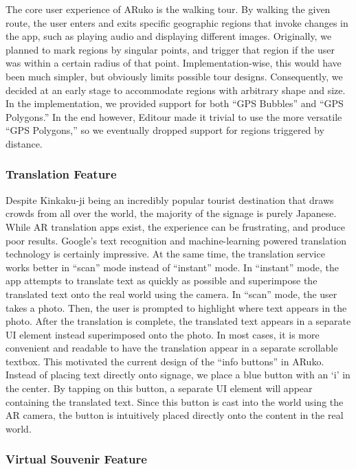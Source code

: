 \documentclass[a4paper, 10pt, american, titlepage]{article}
\begin{document}
The core user experience of ARuko is the walking tour. By walking the given
route, the user enters and exits specific geographic regions that invoke
changes in the app, such as playing audio and displaying different images.
Originally, we planned to mark regions by singular points, and trigger that
region if the user was within a certain radius of that point.
Implementation-wise, this would have been much simpler, but obviously limits
possible tour designs. Consequently, we decided at an early stage to
accommodate regions with arbitrary shape and size.  In the implementation, we
provided support for both ``GPS Bubbles'' and ``GPS Polygons.'' In the end
however, Editour made it trivial to use the more versatile ``GPS Polygons,'' so
we eventually dropped support for regions triggered by distance.

\subsubsection{Translation Feature}
\label{sec:translationFeature}

Despite Kinkaku-ji being an incredibly popular tourist destination that draws
crowds from all over the world, the majority of the signage is purely
Japanese. While AR translation apps exist, the experience can be frustrating,
and produce poor results. Google's text recognition and machine-learning
powered translation technology is certainly impressive. At the same time, the
translation service works better in ``scan'' mode instead of ``instant''
mode. In ``instant'' mode, the app attempts to translate text as quickly as
possible and superimpose the translated text onto the real world using the
camera. In ``scan'' mode, the user takes a photo. Then, the user is prompted
to highlight where text appears in the photo. After the translation is
complete, the translated text appears in a separate UI element instead
superimposed onto the photo. In most cases, it is more convenient and
readable to have the translation appear in a separate scrollable textbox.
This motivated the current design of the ``info buttons'' in ARuko. Instead
of placing text directly onto signage, we place a blue button with an `i' in
the center. By tapping on this button, a separate UI element will appear
containing the translated text. Since this button is cast into the world
using the AR camera, the button is intuitively placed directly onto the
content in the real world.

\subsubsection{Virtual Souvenir Feature}
\label{sec:virtualSouveneir}
\end{document}
